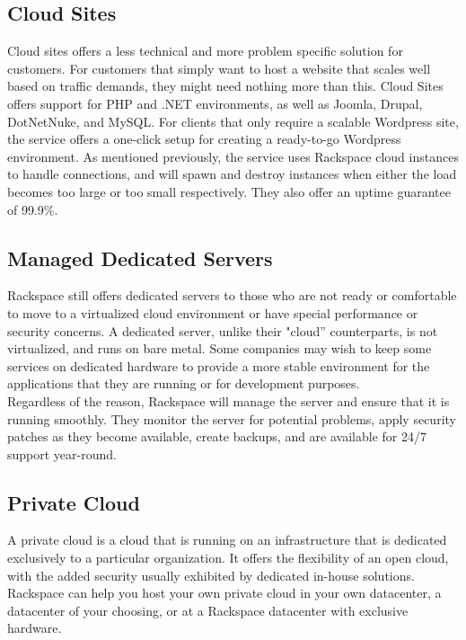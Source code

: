 \documentclass[DIV=calc, paper=letter, fontsize=12pt, twocolumn]{scrartcl}	 %
\begin{document}
\subsection*{Cloud Sites}

Cloud sites offers a less technical and more problem specific solution for customers.
For customers that simply want to host a website that scales well based on
traffic demands, they might need nothing more than this. Cloud Sites offers
support for PHP and .NET environments, as well as Joomla, Drupal, DotNetNuke,
and MySQL. For clients that only require a scalable Wordpress site, the service
offers a one-click setup for creating a ready-to-go Wordpress environment. As 
mentioned previously, the service uses Rackspace cloud instances to handle 
connections, and will spawn and destroy instances when either the load becomes
too large or too small respectively. They also offer an uptime guarantee of 
99.9\%.

\subsection*{Managed Dedicated Servers}

Rackspace still offers dedicated servers to those who are not ready or comfortable
to move to a virtualized cloud environment or have special performance or security
concerns. A dedicated server, unlike their "cloud'' counterparts, is not virtualized,
and runs on bare metal. Some companies may wish to keep some services on dedicated
hardware to provide a more stable environment for the applications that they
are running or for development purposes.
\\

Regardless of the reason, Rackspace will manage the server and ensure that it is 
running smoothly. They monitor the server for potential problems, apply security
patches as they become available, create backups, and are available for 24/7
support year-round.

\subsection*{Private Cloud}

A private cloud is a cloud that is running on an infrastructure that is dedicated
exclusively to a particular organization. It offers the flexibility of an
open cloud, with the added security usually exhibited by dedicated in-house
solutions. Rackspace can help you host your own private cloud in your own datacenter,
a datacenter of your choosing, or at a Rackspace datacenter with exclusive hardware.
\\
\end{document}
